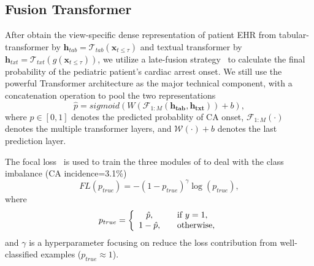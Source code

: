 \subsection{Fusion Transformer}
After obtain the view-specific dense representation of patient EHR from tabular-transformer by $\mathbf{h}_{tab}=\mathcal{T}_{tab}(\mathbf{x}_{t\leq \tau})$ and textual transformer by $\mathbf{h}_{txt}=\mathcal{T}_{txt}(g(\mathbf{x}_{t\leq \tau}))$, we utilize a late-fusion strategy~\cite{shi2021multimodal,lu2023mug} to calculate the final probability of the pediatric patient's cardiac arrest onset. 
We still use the powerful Transformer architecture as the major technical component, with a concatenation operation to pool the two representations
\begin{equation}
\hat{p}=sigmoid(W(\mathcal{F}_{1:M}(\mathbf{h_{tab}},\mathbf{h_{txt}}))+b),
\end{equation}
where $\hat{p} \in [0, 1]$ denotes the predicted probablity of CA onset, $\mathcal{F}_{1:M}(\cdot)$ denotes the multiple transformer layers, and $\mathcal{W}(\cdot)+b$ denotes the last prediction layer.  

The focal loss~\cite{ross2017focal} is used to train the three modules of \modelname to deal with the class imbalance (CA incidence=3.1\%)
\begin{equation}
FL(p_{true})=-(1-p_{true})^{\gamma}\log(p_{true}),
\end{equation}
where
\begin{equation}
p_{true}=
\left\{
    \begin{array}{ c l }
    \hat{p}, & \quad \textrm{if } y=1,\\
    1-\hat{p}, & \quad \textrm{otherwise},\\
    \end{array}
\right.
\end{equation}
and $\gamma$ is a hyperparameter focusing on reduce the loss contribution from well-classified examples ($p_{true} \approx1$).

